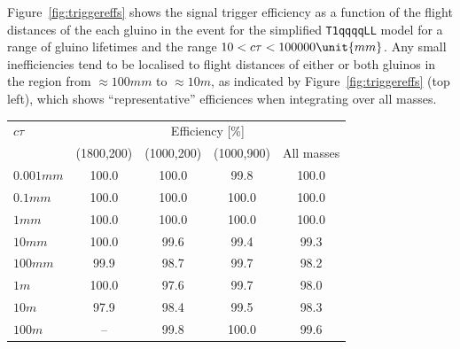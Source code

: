 Figure~\ref{fig:triggereffs} shows the signal trigger efficiency as a
function of the flight distances of the each gluino in the event for
the simplified \texttt{T1qqqqLL} model for a range of gluino lifetimes
and the range $10 < \ctau < 100000\unit{mm}$. Any small inefficiencies
tend to be localised to flight distances of either or both gluinos in
the region from ${\approx}100\unit{mm}$ to ${\approx}10\unit{m}$, as
indicated by Figure~\ref{fig:triggereffs} (top left), which shows
``representative'' efficiences when integrating over all masses.

\begin{table}[h!]
  \centering
  \begin{tabular}{lcccc} 
    \hline
    $c\tau$          & \multicolumn{4}{c}{Efficiency [\%]}               \\
    \cline{2-5}
                     & (1800,200) & (1000,200) & (1000,900) & All masses \\
    \hline
    $0.001\unit{mm}$ & 100.0      & 100.0      & 99.8       & 100.0      \\
    $0.1\unit{mm}$   & 100.0      & 100.0      & 100.0      & 100.0      \\
    $1\unit{mm}$     & 100.0      & 100.0      & 100.0      & 100.0      \\
    $10\unit{mm}$    & 100.0      & 99.6       & 99.4       & 99.3       \\
    $100\unit{mm}$   & 99.9       & 98.7       & 99.7       & 98.2       \\
    $1\unit{m}$      & 100.0      & 97.6       & 99.7       & 98.0       \\
    $10\unit{m}$     & 97.9       & 98.4       & 99.5       & 98.3       \\
    $100\unit{m}$    & --         & 99.8       & 100.0      & 99.6       \\
    \hline
  \end{tabular}
  \label{tab:LLP-triggereff}
\end{table}

